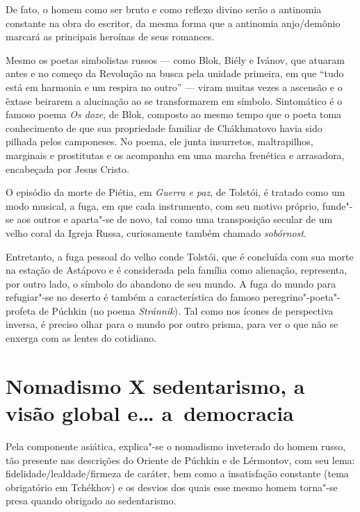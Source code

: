 De fato, o homem como ser bruto e como reflexo divino serão a antinomia constante na obra do escritor, da mesma forma que a antinomia anjo/demônio marcará as principais heroínas de seus romances.

Mesmo os poetas simbolistas russos --- como Blok, Biély e Ivánov, que atuaram antes e no começo da Revolução na busca pela unidade primeira, em que ``tudo está em harmonia e um respira no outro'' --- viram muitas vezes a ascensão e o êxtase beirarem a alucinação ao se transformarem em símbolo. Sintomático é o famoso poema \emph{Os doze}, de Blok, composto ao mesmo tempo que o poeta toma conhecimento de que sua propriedade familiar de Chákhmatovo havia sido pilhada pelos camponeses. No poema,
ele junta insurretos, maltrapilhos, marginais e prostitutas e os acompanha em uma marcha frenética e arrasadora, encabeçada por Jesus Cristo.

O episódio da morte de Piétia, em \emph{Guerra e paz}, de Tolstói, é tratado como um modo musical, a fuga, em que cada instrumento, com seu motivo próprio, funde"-se aos outros e aparta"-se de novo, tal como uma transposição secular de um velho coral da Igreja Russa, curiosamente também chamado \emph{sobórnost}.

Entretanto, a fuga pessoal do velho conde Tolstói, que é concluída com sua morte na estação de Astápovo e é considerada pela família como alienação, representa, por outro lado, o símbolo do abandono de seu mundo. A fuga do mundo para refugiar"-se no deserto é também a característica do famoso peregrino"-poeta"-profeta de Púchkin (no poema \emph{Stránnik}). Tal como nos ícones de perspectiva inversa, é preciso olhar para o mundo por outro prisma, para ver o que não se enxerga com as lentes do cotidiano.

\section{\uppercase{N}omadismo X sedentarismo, a visão global e\ldots{} a~democracia}

Pela componente asiática, explica"-se o nomadismo inveterado do homem russo, tão presente nas descrições do Oriente de Púchkin e de Lérmontov, com seu lema: fidelidade/lealdade/firmeza de caráter, bem como a insatisfação constante (tema obrigatório em Tchékhov) e os desvios dos quais esse mesmo homem torna"-se presa quando obrigado ao sedentarismo.

